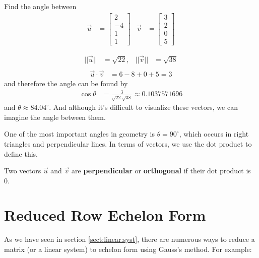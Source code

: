 \begin{example}
Find the angle between
%
\begin{align*}
\vec{u} & = \begin{bmatrix}
2 \\ -4 \\ 1 \\ 1
\end{bmatrix} & \vec{v} & = \begin{bmatrix}
3 \\ 2 \\ 0 \\ 5
\end{bmatrix}
\end{align*}

\solution

\begin{align*}
||\vec{u}|| & =\sqrt{22}, & ||\vec{v}|| & = \sqrt{38} \\
\end{align*}
\begin{align*}
\vec{u} \cdot \vec{v} & = 6-8+0+5 = 3
\end{align*}
and therefore the angle can be found by
%
\begin{align*}
\cos \theta & = \frac{3}{\sqrt{22}\sqrt{38}} \approx 0.1037571696
\end{align*}
and $\theta \approx 84.04^{\circ}$.   And although it's difficult to visualize these vectors, we can imagine the angle between them.
\end{example}

One of the most important angles in geometry is $\theta=90^{\circ}$, which occurs in right triangles and perpendicular lines.  In terms of vectors, we use the dot product to define this.

\begin{definition}
Two vectors $\vec{u}$ and $\vec{v}$ are \textbf{perpendicular} or \textbf{orthogonal} if their dot product is 0.
\end{definition}



\vfill \pagebreak

\section{Reduced Row Echelon Form} \label{sect:reduced:row:echelon}

As we have seen in section \ref{sect:linear:syst}, there are numerous ways to reduce a matrix (or a linear system) to echelon form using Gauss's method.  For example:

